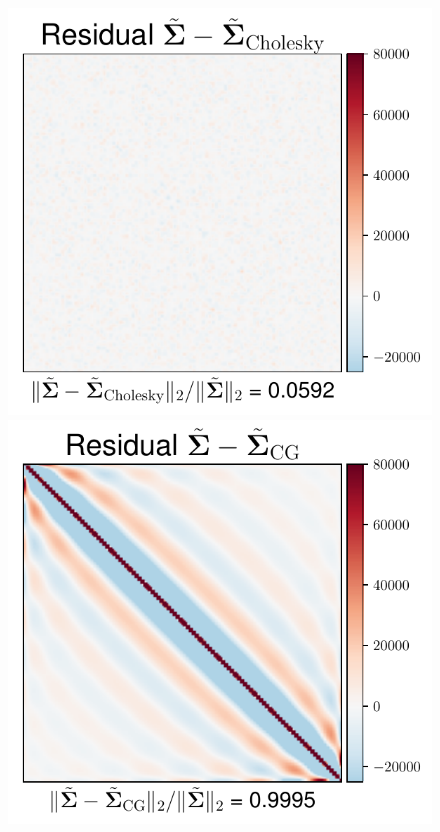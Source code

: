 \documentclass[aspectratio=169]{beamer}
\begin{document}
\begin{frame}
\begin{figure}
    \mbox{{\includegraphics[scale=0.3]{src/images/simu1_ex1_invA_Chol.pdf}}}
    \mbox{{\includegraphics[scale=0.3]{src/images/simu1_ex1_invA_CG.pdf}}}

\end{figure}
\end{frame}
\end{document}
